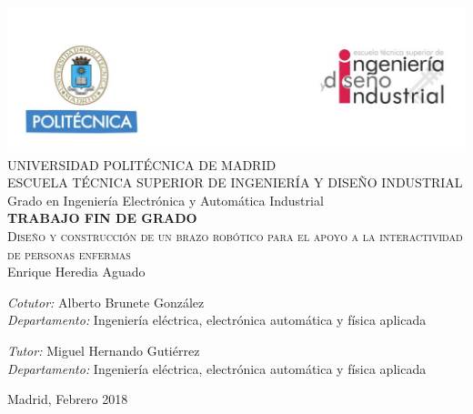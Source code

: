 \begin{titlepage}
\begin{center}

 \includegraphics[width=1\textwidth]{figuras/cabecera.png}  \\[0.3 cm]

\Large UNIVERSIDAD POLITÉCNICA DE MADRID \\ [0.8 cm]

\Large ESCUELA TÉCNICA SUPERIOR DE INGENIERÍA Y DISEÑO INDUSTRIAL \\ [0.8 cm]

\LARGE Grado en Ingeniería Electrónica y Automática Industrial\\ [0.8 cm]

\LARGE \textbf{TRABAJO FIN DE GRADO}\\[0.8 cm]

\Huge \textsc{Diseño y construcción de un brazo robótico para el apoyo a la interactividad de personas enfermas}\\[0.8 cm]

\LARGE Enrique Heredia Aguado \\[1.7 cm]


\begin{multicols}{2} 
\begin{flushleft} \Large
\emph{Cotutor:} Alberto Brunete González \\
\emph{Departamento:} Ingeniería eléctrica, electrónica automática y física aplicada
\end{flushleft}

\begin{flushleft} \Large
\emph{Tutor:} Miguel Hernando Gutiérrez\\
\emph{Departamento:} Ingeniería eléctrica, electrónica automática y física aplicada
\end{flushleft}

\end{multicols} 

\vfill

{\large Madrid, Febrero 2018}

\end{center}
\end{titlepage}